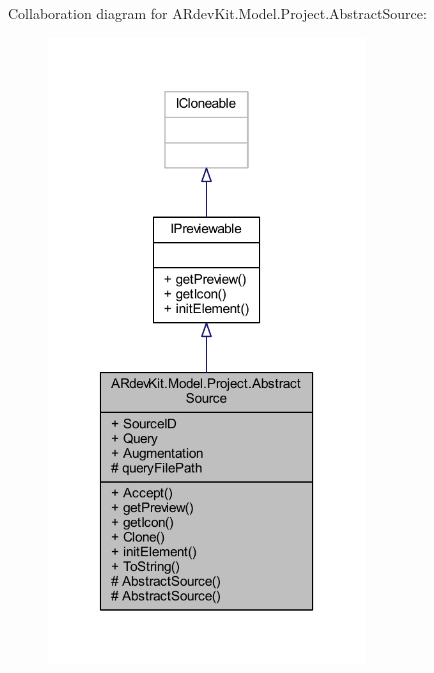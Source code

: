 Collaboration diagram for A\-Rdev\-Kit.\-Model.\-Project.\-Abstract\-Source\-:
\nopagebreak
\begin{figure}[H]
\begin{center}
\leavevmode
\includegraphics[width=238pt]{class_a_rdev_kit_1_1_model_1_1_project_1_1_abstract_source__coll__graph}
\end{center}
\end{figure}
